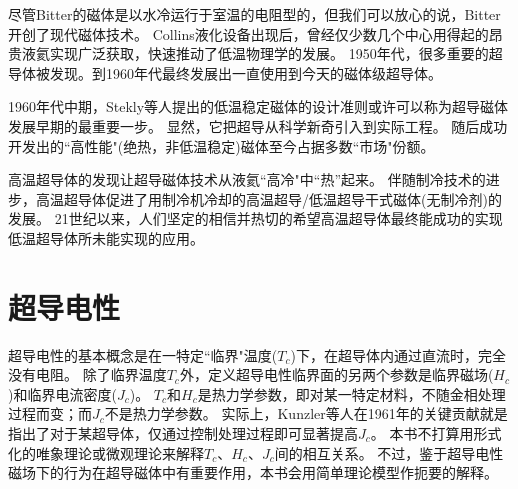 \begin{table}[htbp]
\end{table}

尽管Bitter的磁体是以水冷运行于室温的电阻型的，但我们可以放心的说，Bitter开创了现代磁体技术。
Collins液化设备出现后，曾经仅少数几个中心用得起的昂贵液氦实现广泛获取，快速推动了低温物理学的发展。
1950年代，很多重要的超导体被发现。到1960年代最终发展出一直使用到今天的磁体级超导体。

1960年代中期，Stekly等人提出的低温稳定磁体的设计准则或许可以称为超导磁体发展早期的最重要一步。
显然，它把超导从科学新奇引入到实际工程。
随后成功开发出的``高性能"(绝热，非低温稳定)磁体至今占据多数``市场"份额。

高温超导体的发现让超导磁体技术从液氦``高冷"中``热''起来。
伴随制冷技术的进步，高温超导体促进了用制冷机冷却的高温超导/低温超导干式磁体(无制冷剂)的发展。
21世纪以来，人们坚定的相信并热切的希望高温超导体最终能成功的实现低温超导体所未能实现的应用。

\section{超导电性}
超导电性的基本概念是在一特定``临界"温度($T_c$)下，在超导体内通过直流时，完全没有电阻。
除了临界温度$T_c$外，定义超导电性临界面的另两个参数是临界磁场($H_c$)和临界电流密度($J_c$)。
$T_c$和$H_c$是热力学参数，即对某一特定材料，不随金相处理过程而变；而$J_c$不是热力学参数。
实际上，Kunzler等人在1961年的关键贡献就是指出了对于某超导体，仅通过控制处理过程即可显著提高$J_c$。
本书不打算用形式化的唯象理论或微观理论来解释$T_c$、$H_c$、$J_c$间的相互关系。
不过，鉴于超导电性磁场下的行为在超导磁体中有重要作用，本书会用简单理论模型作扼要的解释。

